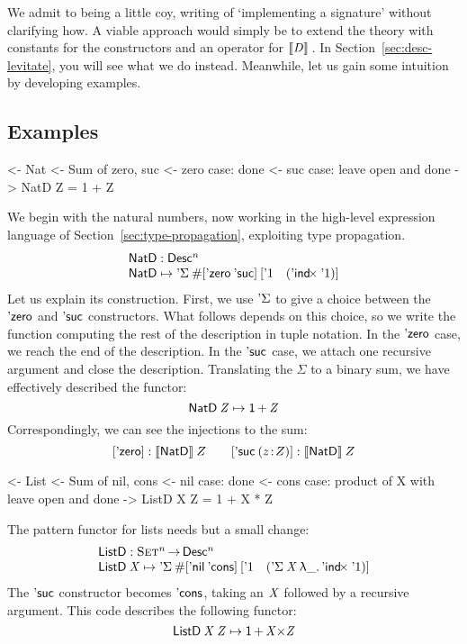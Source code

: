 We admit to being a little coy,
writing of `implementing a signature' without clarifying how. A viable
approach would simply be to extend the theory with constants for the
constructors and an operator for \(\descop{\V{D}}\). In
Section~\ref{sec:desc-levitate}, you will see what we do instead.
Meanwhile, let us gain some intuition by developing examples.

\subsection{Examples}
\label{sec:desc-examples}

\begin{wstructure}
<- Nat
    <- Sum of zero, suc
    <- zero case: done
    <- suc case: leave open and done
    -> NatD Z = 1 + Z
\end{wstructure}

We begin with the natural numbers, now working in the high-level
expression language of Section~\ref{sec:type-propagation}, exploiting
type propagation.
%
\[\stk{
\NatD : \Desc^n \\
\NatD \mapsto \DSigma{\EnumT{\sqr{\NatZero\: \SYMBNatSuc }}}
                     {\sqr{ \DUnit \quad (\DIndx{\DUnit}) }}
}\]
%
Let us explain its construction. First, we use $\SYMBDSigma$ to
give a choice between the $\NatZero$ and $\SYMBNatSuc$ constructors.
What follows depends on this choice, so we write the function
computing the rest of the description in tuple notation.  In the
$\NatZero$ case, we reach the end of the description. In the
$\SYMBNatSuc$ case, we attach one recursive argument and close the
description. Translating the \(\Sigma\) to a binary sum, we have
effectively described the functor:
%
\[    \NatD\: \V{Z} \mapsto \Unit \mathop{\D{+}} \V{Z}    \]
Correspondingly, we can see the injections to the sum:
\[
\sqr{\NatZero}:\descop{\NatD}Z \qquad
\sqr{\NatSuc{(\Bhab{z}{Z})}}:\descop{\NatD}Z
\]

\begin{wstructure}
<- List
    <- Sum of nil, cons
    <- nil case: done
    <- cons case: product of X with leave open and done
    -> ListD X Z = 1 + X * Z
\end{wstructure}

The pattern functor
for lists needs but a small change:
%
\[\stk{
\ListD : \Set^n \To \Desc^n \\
\ListD \: \V{X} \mapsto
 \DSigma{\EnumT{\sqr{ \ListNil\: \SYMBListCons }}}
         {\sqr{ \DUnit \quad (\DSigma{\V{X}}{\LAM{\_} \DIndx{\DUnit}}) }}
}\]
%
The $\SYMBNatSuc$ constructor becomes
$\SYMBListCons$, taking an $\V{X}$ followed by a
recursive argument. This code describes the following functor:
%
\[    \ListD\: \V{X}\: \V{Z} \mapsto \Unit \mathop{\D{+}} \V{X} \D{\ensuremath{\times}} \V{Z}     \]

